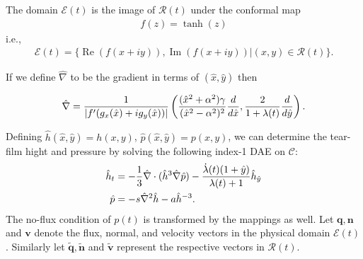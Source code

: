 The domain $\mathcal{E}(t)$ is the image of $\mathcal{R}(t)$ under the conformal map
\begin{align}
f(z) = \tanh(z)	
\end{align}
i.e.,
\begin{align}
\mathcal{E}(t) = \{\operatorname{Re}(f(x+iy)),\operatorname{Im}(f(x+iy))|(x,y) \in \mathcal{R}(t)  \}.
\end{align}

If we define $\hat{\nabla}$ to be the gradient in terms of $(\hat{x},\hat{y})$ then

\begin{align}
\hat{\nabla} = \frac{1}{|f'(g_x(\hat{x})+i g_y(\hat{x}))|} \left( \frac{(\hat{x}^2+\alpha^2)\gamma}{(\hat{x}^2-\alpha^2)^2} \frac{d}{d \hat{x}}, \frac{2}{1+\lambda(t)} \frac{d}{d \hat{y}} \right).
\end{align}

Defining $\hat{h}(\hat{x},\hat{y})=h(x,y)$, $\hat{p}(\hat{x},\hat{y})=p(x,y)$, we can determine the tear-film hight and pressure by solving the following index-1 DAE on $\mathcal{C}$:
\begin{align}
\begin{aligned}
\hat{h}_t &= -\frac{1}{3} \hat{\nabla} \cdot (\hat{h}^3 \hat{\nabla} \hat{p}) -\frac{\dot{\lambda}(t)(1+\hat{y})}{\lambda(t)+1} \hat{h}_{\hat{y}} \\
\hat{p} &= - s \hat{\nabla}^2 \hat{h} - a \hat{h}^{-3}.
\end{aligned}
\end{align}
The no-flux condition of $p(t)$ is transformed by the mappings as well. Let $\bm{q},\bm{n}$ and $\bm{v}$ denote the flux, normal, and velocity vectors in the physical domain $\mathcal{E}(t)$. Similarly let $\bm{\tilde{q}},\bm{\tilde{n}}$ and $\bm{\tilde{v}}$ represent the respective vectors in $\mathcal{R}(t)$. 





